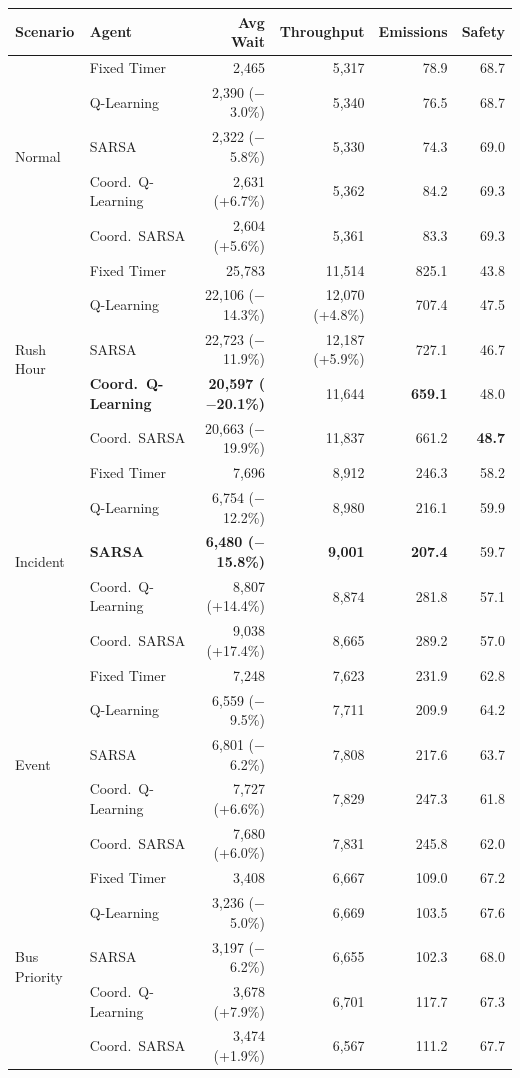 \documentclass[11pt, a4paper]{article}
\begin{document}
\begin{table}[H]
\centering
\footnotesize
\begin{tabular}{@{}ll|rrrr@{}}
    \toprule
    \textbf{Scenario} & \textbf{Agent} & \textbf{Avg Wait} & \textbf{Throughput} & \textbf{Emissions} & \textbf{Safety} \\
    \midrule
    \multirow{5}{*}{Normal} & Fixed Timer & 2,465 & 5,317 & 78.9 & 68.7 \\
    & Q-Learning & 2,390 ($-$3.0\%) & 5,340 & 76.5 & 68.7 \\
    & SARSA & 2,322 ($-$5.8\%) & 5,330 & 74.3 & 69.0 \\
    & Coord.\ Q-Learning & 2,631 (+6.7\%) & 5,362 & 84.2 & 69.3 \\
    & Coord.\ SARSA & 2,604 (+5.6\%) & 5,361 & 83.3 & 69.3 \\
    \midrule
    \multirow{5}{*}{Rush Hour} & Fixed Timer & 25,783 & 11,514 & 825.1 & 43.8 \\
    & Q-Learning & 22,106 ($-$14.3\%) & 12,070 (+4.8\%) & 707.4 & 47.5 \\
    & SARSA & 22,723 ($-$11.9\%) & 12,187 (+5.9\%) & 727.1 & 46.7 \\
    & \textbf{Coord.\ Q-Learning} & \textbf{20,597 ($-$20.1\%)} & 11,644 & \textbf{659.1} & 48.0 \\
    & Coord.\ SARSA & 20,663 ($-$19.9\%) & 11,837 & 661.2 & \textbf{48.7} \\
    \midrule
    \multirow{5}{*}{Incident} & Fixed Timer & 7,696 & 8,912 & 246.3 & 58.2 \\
    & Q-Learning & 6,754 ($-$12.2\%) & 8,980 & 216.1 & 59.9 \\
    & \textbf{SARSA} & \textbf{6,480 ($-$15.8\%)} & \textbf{9,001} & \textbf{207.4} & 59.7 \\
    & Coord.\ Q-Learning & 8,807 (+14.4\%) & 8,874 & 281.8 & 57.1 \\
    & Coord.\ SARSA & 9,038 (+17.4\%) & 8,665 & 289.2 & 57.0 \\
    \midrule
    \multirow{5}{*}{Event} & Fixed Timer & 7,248 & 7,623 & 231.9 & 62.8 \\
    & Q-Learning & 6,559 ($-$9.5\%) & 7,711 & 209.9 & 64.2 \\
    & SARSA & 6,801 ($-$6.2\%) & 7,808 & 217.6 & 63.7 \\
    & Coord.\ Q-Learning & 7,727 (+6.6\%) & 7,829 & 247.3 & 61.8 \\
    & Coord.\ SARSA & 7,680 (+6.0\%) & 7,831 & 245.8 & 62.0 \\
    \midrule
    \multirow{5}{*}{Bus Priority} & Fixed Timer & 3,408 & 6,667 & 109.0 & 67.2 \\
    & Q-Learning & 3,236 ($-$5.0\%) & 6,669 & 103.5 & 67.6 \\
    & SARSA & 3,197 ($-$6.2\%) & 6,655 & 102.3 & 68.0 \\
    & Coord.\ Q-Learning & 3,678 (+7.9\%) & 6,701 & 117.7 & 67.3 \\
    & Coord.\ SARSA & 3,474 (+1.9\%) & 6,567 & 111.2 & 67.7 \\
    \bottomrule
\end{tabular}
\end{table}
\end{document}
